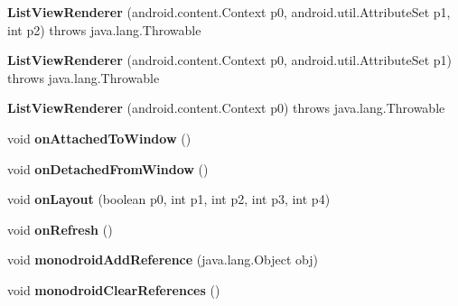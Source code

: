 \begin{DoxyCompactItemize}
\item 
\mbox{\label{classmd5b60ffeb829f638581ab2bb9b1a7f4f3f_1_1_list_view_renderer_add061c8b593d05e8c08a3b32390f1693}} 
{\bfseries List\+View\+Renderer} (android.\+content.\+Context p0, android.\+util.\+Attribute\+Set p1, int p2)  throws java.\+lang.\+Throwable 	
\item 
\mbox{\label{classmd5b60ffeb829f638581ab2bb9b1a7f4f3f_1_1_list_view_renderer_ae63e27dcc4de3ca21c49eba92efaaca0}} 
{\bfseries List\+View\+Renderer} (android.\+content.\+Context p0, android.\+util.\+Attribute\+Set p1)  throws java.\+lang.\+Throwable 	
\item 
\mbox{\label{classmd5b60ffeb829f638581ab2bb9b1a7f4f3f_1_1_list_view_renderer_a94f680200f61591dc6b8b56984ea1db5}} 
{\bfseries List\+View\+Renderer} (android.\+content.\+Context p0)  throws java.\+lang.\+Throwable 	
\item 
\mbox{\label{classmd5b60ffeb829f638581ab2bb9b1a7f4f3f_1_1_list_view_renderer_ae8bbcebd2d1fba70c74cfdf6c44e755d}} 
void {\bfseries on\+Attached\+To\+Window} ()
\item 
\mbox{\label{classmd5b60ffeb829f638581ab2bb9b1a7f4f3f_1_1_list_view_renderer_ad69b0d3bf09e4c1ec70515fab015975e}} 
void {\bfseries on\+Detached\+From\+Window} ()
\item 
\mbox{\label{classmd5b60ffeb829f638581ab2bb9b1a7f4f3f_1_1_list_view_renderer_aaab562eda2712d67615715b8aa3d00c7}} 
void {\bfseries on\+Layout} (boolean p0, int p1, int p2, int p3, int p4)
\item 
\mbox{\label{classmd5b60ffeb829f638581ab2bb9b1a7f4f3f_1_1_list_view_renderer_a8dd7354cec7536410158693968e43b0f}} 
void {\bfseries on\+Refresh} ()
\item 
\mbox{\label{classmd5b60ffeb829f638581ab2bb9b1a7f4f3f_1_1_list_view_renderer_a86959f77d1bb744ab196062ffa0c4a1a}} 
void {\bfseries monodroid\+Add\+Reference} (java.\+lang.\+Object obj)
\item 
\mbox{\label{classmd5b60ffeb829f638581ab2bb9b1a7f4f3f_1_1_list_view_renderer_aa025a82d6f89159ae49a0b1b53722295}} 
void {\bfseries monodroid\+Clear\+References} ()
\end{DoxyCompactItemize}
